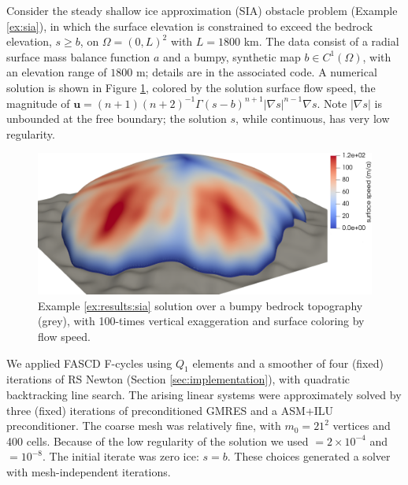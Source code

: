 \documentclass[review,hidelinks,onefignum,onetabnum]{siamart220329}
\newcommand{\grad}{\nabla}
\begin{document}
\begin{example}   \label{ex:results:sia}
Consider the steady shallow ice approximation (SIA) obstacle problem (Example \ref{ex:sia}), in which the surface elevation is constrained to exceed the bedrock elevation, $s\ge b$, on $\Omega=(0,L)^2$ with $L=1800$ km.  The data consist of a radial surface mass balance function $a$ \cite[equation (5.122)]{GreveBlatter2009} and a bumpy, synthetic map $b\in C^1(\Omega)$, with an elevation range of $1800$ m; details are in the associated code.  A numerical solution is shown in Figure \ref{fig:results:siascene}, colored by the solution surface flow speed, the magnitude of $\mathbf{u} = (n+1)(n+2)^{-1} \Gamma (s-b)^{n+1} |\grad s|^{n-1} \grad s$.  Note $|\grad s|$ is unbounded at the free boundary; the solution $s$, while continuous, has very low regularity.

\begin{figure}[ht]
\centering
\includegraphics[width=1.0\textwidth]{fixfigs/sialev8scene.png}
\caption{Example \ref{ex:results:sia} solution over a bumpy bedrock topography (grey), with 100-times vertical exaggeration and surface coloring by flow speed.}
\label{fig:results:siascene}
\end{figure}

We applied FASCD F-cycles using $Q_1$ elements and a smoother of four (fixed) iterations of RS Newton (Section \ref{sec:implementation}), with quadratic backtracking line search.  The arising linear systems were approximately solved by three (fixed) iterations of preconditioned GMRES and a ASM+ILU preconditioner.  The coarse mesh was relatively fine, with $m_0=21^2$ vertices and 400 cells.  Because of the low regularity of the solution we used  $= 2 \times 10^{-4}$ and  $= 10^{-8}$.  The initial iterate was zero ice: $s=b$.  These choices generated a solver with mesh-independent iterations.


\end{example}
\end{document}
